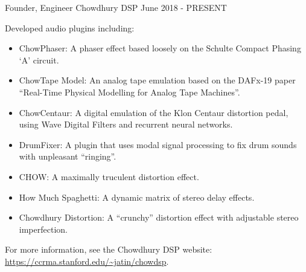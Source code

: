 

\begin{cventries}

    \cventry
    {Founder, Engineer} %
    {Chowdhury DSP} %
    {} %
    {June 2018 - PRESENT} %
    {
      \begin{cvitems} %
        \item {Developed audio plugins including:}
        \begin{itemize}
            \item {ChowPhaser: A phaser effect based loosely on the Schulte Compact Phasing `A' circuit.}
            \item {ChowTape Model: An analog tape emulation based on the DAFx-19 paper ``Real-Time Physical Modelling for Analog Tape Machines''.}
            \item {ChowCentaur: A digital emulation of the Klon Centaur distortion pedal, using Wave Digital Filters and recurrent neural networks.}
            \item {DrumFixer: A plugin that uses modal signal processing to fix drum sounds with unpleasant ``ringing''.}
            \item {CHOW: A maximally truculent distortion effect.}
            \item {How Much Spaghetti: A dynamic matrix of stereo delay effects.}
            \item {Chowdhury Distortion: A ``crunchy'' distortion effect with adjustable stereo imperfection.}
        \end{itemize}
        \item {For more information, see the Chowdhury DSP website: \url{https://ccrma.stanford.edu/~jatin/chowdsp}.}
      \end{cvitems}
    }


\end{cventries}
